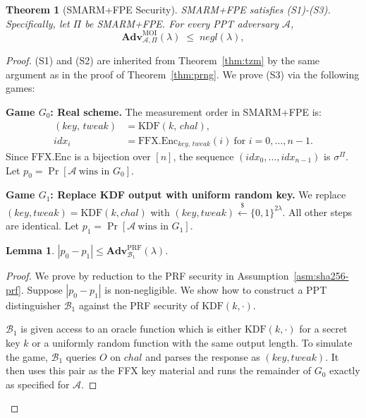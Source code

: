 \documentclass{ieeeaccess}
\newcommand{\rtsmarmtwo}{SMARM+FPE\xspace}
\newtheorem{lemma}{Lemma}[section]
\newtheorem{theorem}{Theorem}[section]
\newcommand{\Adv}{\mathbf{Adv}}
\begin{document}
\begin{theorem}[\rtsmarmtwo Security]
\label{thm:fpe}
\rtsmarmtwo satisfies (S1)-(S3).
Specifically, let $\Pi$ be \rtsmarmtwo.
For every PPT adversary $\mathcal{A}$,
\[
  \Adv^{\mathrm{MOI}}_{\mathcal{A},\Pi}(\lambda) \;\leq\; \mathit{negl}(\lambda),
\]
\end{theorem}

\begin{proof}
(S1) and (S2) are inherited from Theorem~\ref{thm:tzm} by the same
argument as in the proof of Theorem~\ref{thm:prng}.
We prove (S3) via the following games:
 
\medskip
\noindent\textbf{Game $G_0$: Real scheme.}
The measurement order in \rtsmarmtwo is:
\begin{align*}
  (\mathit{key},\, \mathit{tweak})
      &= \mathrm{KDF}(k,\, \mathit{chal}), \\
  \mathit{idx}_i
      &= \mathrm{FFX.Enc}_{\mathit{key},\,\mathit{tweak}}(i)
         \ \text{for } i = 0,\dots,n-1.
\end{align*}
Since $\mathrm{FFX.Enc}$ is a bijection over $[n]$, the sequence
$(\mathit{idx}_0,\dots,\mathit{idx}_{n-1})$ is $\sigma^\Pi$.
Let $p_0 = \Pr[\mathcal{A}\ \text{wins in }G_0]$.
 
\medskip
\noindent\textbf{Game $G_1$: Replace KDF output with uniform random key.}
We replace $(\mathit{key},\mathit{tweak}) = \mathrm{KDF}(k,\mathit{chal})$
with $(\mathit{key},\mathit{tweak}) \xleftarrow{\$} \{0,1\}^{2\lambda}$.
All other steps are identical.
Let $p_1 = \Pr[\mathcal{A}\ \text{wins in }G_1]$.
 
\begin{lemma}
\label{lem:fpe-g0-g1}
$|p_0 - p_1| \leq \Adv^{\mathrm{PRF}}_{\mathcal{B}_1}(\lambda)$.
\end{lemma}
\begin{proof}
We prove by reduction to the PRF security in Assumption~\ref{asm:sha256-prf}.
Suppose $|p_0 - p_1|$ is non-negligible.
We show how to construct a PPT distinguisher $\mathcal{B}_1$ against the PRF security of
$\mathrm{KDF}(k,\cdot)$.

$\mathcal{B}_1$ is given access to an oracle function
which is either $\mathrm{KDF}(k,\cdot)$ for a secret key $k$ or a uniformly random
function with the same output length.
To simulate the game, $\mathcal{B}_1$ queries $O$ on
$\mathit{chal}$ and parses the response as
$(\mathit{key},\mathit{tweak})$.
It then uses this pair as the FFX key material and runs the remainder of
$G_0$ exactly as specified for $\mathcal{A}$.


\end{proof}
\end{proof}
\end{document}
